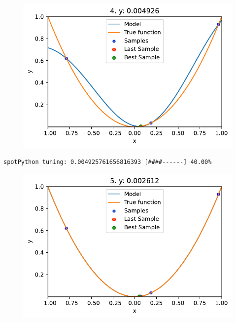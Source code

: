 \documentclass[
  letterpaper,
  DIV=11,
  numbers=noendperiod]{scrreprt}
\begin{document}
\begin{figure}[H]

{\centering \includegraphics{04_spot_sklearn_surrogate_files/figure-pdf/cell-25-output-2.pdf}

}

\end{figure}

\begin{verbatim}
spotPython tuning: 0.004925761656816393 [####------] 40.00% 
\end{verbatim}

\begin{figure}[H]

{\centering \includegraphics{04_spot_sklearn_surrogate_files/figure-pdf/cell-25-output-4.pdf}

}

\end{figure}
\end{document}
